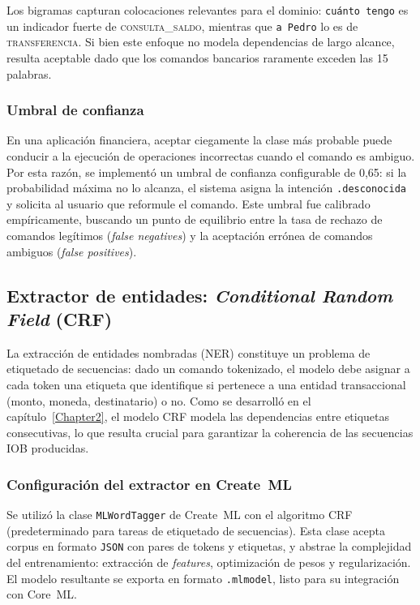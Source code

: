 Los bigramas capturan colocaciones relevantes para el dominio: \texttt{cuánto tengo} es un indicador fuerte de \textsc{consulta\_saldo}, mientras que \texttt{a Pedro} lo es de \textsc{transferencia}. Si bien este enfoque no modela dependencias de largo alcance, resulta aceptable dado que los comandos bancarios raramente exceden las 15 palabras.

\subsubsection{Umbral de confianza}

En una aplicación financiera, aceptar ciegamente la clase más probable puede conducir a la ejecución de operaciones incorrectas cuando el comando es ambiguo. Por esta razón, se implementó un umbral de confianza configurable de 0,65: si la probabilidad máxima no lo alcanza, el sistema asigna la intención \texttt{.desconocida} y solicita al usuario que reformule el comando. Este umbral fue calibrado empíricamente, buscando un punto de equilibrio entre la tasa de rechazo de comandos legítimos (\textit{false negatives}) y la aceptación errónea de comandos ambiguos (\textit{false positives}).

\subsection{Extractor de entidades: \textit{Conditional Random Field} (CRF)}
\label{subsec:crf}

La extracción de entidades nombradas (NER) constituye un problema de etiquetado de secuencias: dado un comando tokenizado, el modelo debe asignar a cada token una etiqueta que identifique si pertenece a una entidad transaccional (monto, moneda, destinatario) o no. Como se desarrolló en el capítulo~\ref{Chapter2}, el modelo CRF \citep{lafferty2001conditional} modela las dependencias entre etiquetas consecutivas, lo que resulta crucial para garantizar la coherencia de las secuencias IOB producidas.

\subsubsection{Configuración del extractor en Create~ML}

Se utilizó la clase \texttt{MLWord\-Tagger} de Create~ML con el algoritmo CRF (predeterminado para tareas de etiquetado de secuencias). Esta clase acepta corpus en formato \texttt{JSON} con pares de tokens y etiquetas, y abstrae la complejidad del entrenamiento: extracción de \textit{features}, optimización de pesos y regularización. El modelo resultante se exporta en formato \texttt{.mlmodel}, listo para su integración con Core~ML.

